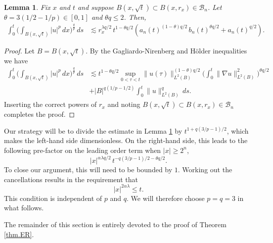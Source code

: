 \documentclass[11pt]{article}
\numberwithin{equation}{section}
\newtheorem{lem}[thm]{Lemma}
\theoremstyle{remark}
\theoremstyle{definition}
\newcommand{\bke}[1]{\left ( #1 \right )}
\newcommand{\nb}{\nabla}
\newcommand\al{\alpha}
\renewcommand\th{\theta}
\newcommand\la{\lambda}
\newcommand{\EQN}[1]{\begin{equation*}\begin{split} #1 \end{split}\end{equation*}}
\begin{document}
 
\begin{lem} \label{lem.interp}Fix $x$ and $t$ and suppose $B(x,\sqrt t)\subset B(x,r_x) \in \mathcal B_n$. Let $\th=3(1/2-1/p)\in [0,1]$  {and $\th q \le 2$}. 
Then,
\EQN{
\int_0^t \bigg( \int_{B(x,\sqrt t)} |u|^p\,dx\bigg)^{\frac q p} \,ds&\lesssim 
%
 {r_x^{ \la q/2} \,t^{1-\th q/2}  \bke{a_n(t)^{(1-\th)q/2} \, b_n(t)^{\th q/2} + a_n(t)^{q/2}}.}
%
}
\end{lem} 
\begin{proof}
Let $B=B(x,\sqrt t)$.
By the Gagliardo-Nirenberg and H\"older inequalities we have 
\EQN{
\int_0^t \bigg( \int_{B(x,\sqrt t)} |u|^p\,dx\bigg)^{\frac q p} \,ds &\lesssim t^{1- \th q/2} \sup_{0<\tau <t}\| u(\tau)\|_{L^2(B)}^{(1-\th)q/2}  \bigg(  \int_0^t \| \nb u\|_{L^2(B)}^2 \bigg)^{\th q /2}
\\&+|B|^{q(1/p-1/2)}\int_0^t  \| u \|_{L^2(B)}^q \,ds.
}
Inserting the correct powers of $r_x$  and noting $B(x,\sqrt t)\subset B(x,r_x) \in \mathcal B_n$ completes the proof. 
\end{proof}


Our strategy will be to divide the estimate in Lemma \ref{lem.interp} by $t^{1+q(3/p-1)/2}$, which makes the left-hand side dimensionless. On the right-hand side, this leads to the following pre-factor on the leading order term when $|x|\geq 2^n$,
\[
{|x|^{\al\la q/2} }\,t^{-q(3/p-1)/2-\th q/2}.
\]
To close our argument, this will need to be bounded by $1$. Working out the cancellations results in the requirement that
\[
|x|^{2\al \la} \leq t.
\]
This condition is independent of $p$ and $q$. We will therefore choose $p=q=3$ in what follows. 



The remainder of this section is entirely devoted to the proof of Theorem \ref{thm.ER}.
\end{document}
